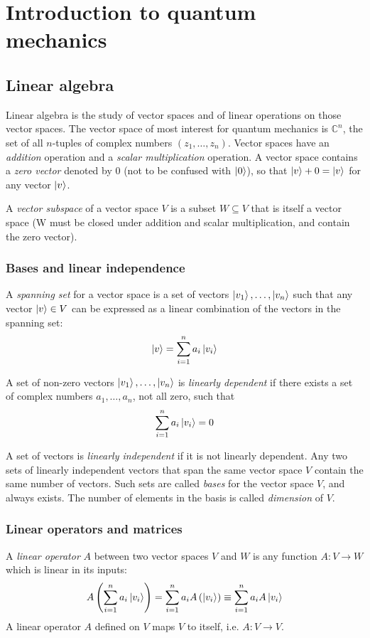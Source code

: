 \chapter{Introduction to quantum mechanics}

\section{Linear algebra}
Linear algebra is the study of vector spaces and of linear operations on those vector spaces.
The vector space of most interest for quantum mechanics is $\mathbb{C}^n$,
the set of all $n$-tuples of complex numbers $(z_1, \ldots, z_n)$.
Vector spaces have an \emph{addition} operation and a \emph{scalar multiplication} operation.
A vector space contains a \emph{zero vector} denoted by $0$
(not to be confused with $\ket{0}$),
so that $\ket{v} + 0 = \ket{v}$ for any vector $\ket{v}$.

A \emph{vector subspace} of a vector space $V$ is a subset $W \subseteq V$ that is itself a vector space
(W must be closed under addition and scalar multiplication, and contain the zero vector).

\subsection{Bases and linear independence}
A \emph{spanning set} for a vector space is a set of vectors $\ket{v_1}, \ldots, \ket{v_n}$ such that any vector $\ket{v} \in V$ can be expressed as a linear combination of the vectors in the spanning set:
\[
    \ket{v} = \sum_{i=1}^n a_i \ket{v_i}
\]

A set of non-zero vectors $\ket{v_1}, \ldots, \ket{v_n}$ is \emph{linearly dependent} if there exists a set of complex numbers $a_1, \ldots, a_n$, not all zero, such that
\[
    \sum_{i=1}^n a_i \ket{v_i} = 0
\]

A set of vectors is \emph{linearly independent} if it is not linearly dependent.
Any two sets of linearly independent vectors that span the same vector space $V$ contain the same number of vectors.
Such sets are called \emph{bases} for the vector space $V$, and always exists.
The number of elements in the basis is called \emph{dimension} of $V$.

\subsection{Linear operators and matrices}
A \emph{linear operator} $A$ between two vector spaces $V$ and $W$ is any function $A: V \to W$ which is linear in its inputs:
\[
    A\left(\sum_{i=1}^n a_i \ket{v_i}\right) = \sum_{i=1}^n a_i A\left(\ket{v_i}\right) \equiv \sum_{i=1}^n a_i A\ket{v_i}
\]
A linear operator $A$ defined on $V$ maps $V$ to itself, i.e. $A: V \to V$.

